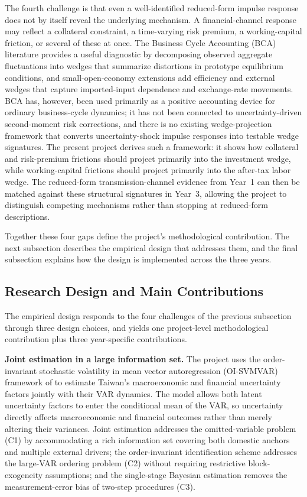\documentclass[12pt]{article}
\begin{document}
The fourth challenge is that even a well-identified reduced-form impulse response does not by itself reveal the underlying mechanism. A financial-channel response may reflect a collateral constraint, a time-varying risk premium, a working-capital friction, or several of these at once. The Business Cycle Accounting (BCA) literature \citep{chari2007business} provides a useful diagnostic by decomposing observed aggregate fluctuations into wedges that summarize distortions in prototype equilibrium conditions, and small-open-economy extensions add efficiency and external wedges that capture imported-input dependence and exchange-rate movements. BCA has, however, been used primarily as a positive accounting device for ordinary business-cycle dynamics; it has not been connected to uncertainty-driven second-moment risk corrections, and there is no existing wedge-projection framework that converts uncertainty-shock impulse responses into testable wedge signatures. The present project derives such a framework: it shows how collateral and risk-premium frictions should project primarily into the investment wedge, while working-capital frictions should project primarily into the after-tax labor wedge. The reduced-form transmission-channel evidence from Year~1 can then be matched against these structural signatures in Year~3, allowing the project to distinguish competing mechanisms rather than stopping at reduced-form descriptions.

Together these four gaps define the project's methodological contribution. The next subsection describes the empirical design that addresses them, and the final subsection explains how the design is implemented across the three years.

\subsection{Research Design and Main Contributions}

The empirical design responds to the four challenges of the previous subsection through three design choices, and yields one project-level methodological contribution plus three year-specific contributions.

\textbf{Joint estimation in a large information set.} The project uses the order-invariant stochastic volatility in mean vector autoregression (OI-SVMVAR) framework of \citet{davidson2025investigating} to estimate Taiwan's macroeconomic and financial uncertainty factors jointly with their VAR dynamics. The model allows both latent uncertainty factors to enter the conditional mean of the VAR, so uncertainty directly affects macroeconomic and financial outcomes rather than merely altering their variances. Joint estimation addresses the omitted-variable problem (C1) by accommodating a rich information set covering both domestic anchors and multiple external drivers; the order-invariant identification scheme addresses the large-VAR ordering problem (C2) without requiring restrictive block-exogeneity assumptions; and the single-stage Bayesian estimation removes the measurement-error bias of two-step procedures (C3).
\end{document}
